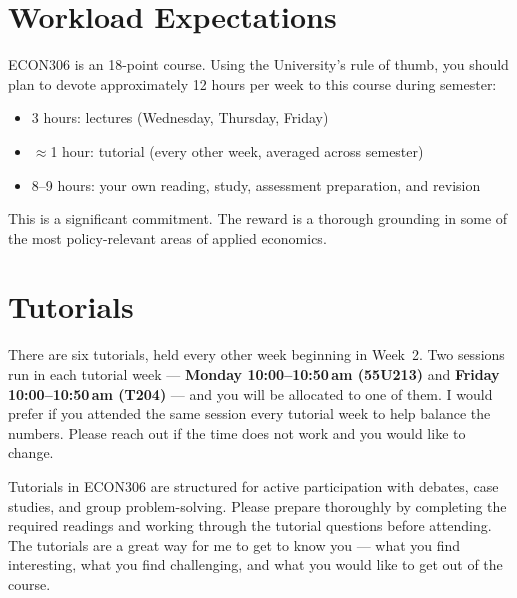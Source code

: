 \documentclass[11pt, a4paper]{article}
\begin{document}
\section{Workload Expectations}

ECON306 is an 18-point course. Using the University's rule of thumb, you should plan to devote approximately 12 hours per week to this course during semester:
\begin{itemize}
  \item 3 hours: lectures (Wednesday, Thursday, Friday)
  \item $\approx$1 hour: tutorial (every other week, averaged across semester)
  \item 8--9 hours: your own reading, study, assessment preparation, and revision
\end{itemize}

This is a significant commitment. The reward is a thorough grounding in some of the most policy-relevant areas of applied economics.

\section{Tutorials}

There are six tutorials, held every other week beginning in Week~2. Two sessions run in each tutorial week — \textbf{Monday 10:00--10:50\,am (55U213)} and \textbf{Friday 10:00--10:50\,am (T204)} — and you will be allocated to one of them. I would prefer if you attended the same session every tutorial week to help balance the numbers. Please reach out if the time does not work and you would like to change.

Tutorials in ECON306 are structured for active participation with debates, case studies, and group problem-solving. Please prepare thoroughly by completing the required readings and working through the tutorial questions before attending. The tutorials are a great way for me to get to know you — what you find interesting, what you find challenging, and what you would like to get out of the course.
\end{document}
